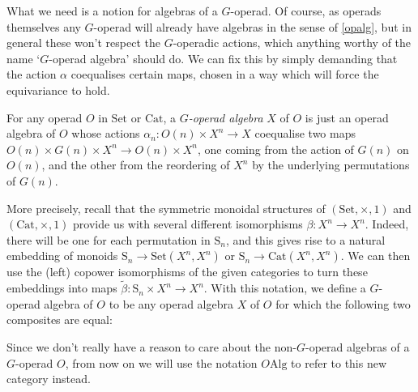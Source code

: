What we need is a notion for algebras of a $G$-operad. Of course, as operads themselves any $G$-operad will already have algebras in the sense of \cref{opalg}, but in general these won't respect the $G$-operadic actions, which anything worthy of the name `$G$-operad algebra' should do. We can fix this by simply demanding that the action $\alpha$ coequalises certain maps, chosen in a way which will force the equivariance to hold.

\begin{defn} \label{Gopalgdef} For any operad $O$ in $\mathrm{Set}$ or $\mathrm{Cat}$, a \emph{$G$-operad algebra} $X$ of $O$ is just an operad algebra of $O$ whose actions $\alpha_n : O(n) \times X^n \to X$ coequalise two maps $O(n) \times G(n) \times X^n \to O(n) \times X^n$, one coming from the action of $G(n)$ on $O(n)$, and the other from the reordering of $X^n$ by the underlying permutations of $G(n)$.

More precisely, recall that the symmetric monoidal structures of $(\mathrm{Set}, \times, 1)$ and $(\mathrm{Cat}, \times, 1)$ provide us with several different isomorphisms $\beta : X^n \to X^n$. Indeed, there will be one for each permutation in $\mathrm{S}_n$, and this gives rise to a natural embedding of monoids $\mathrm{S}_n \to \mathrm{Set}(X^n, X^n)$ or $\mathrm{S}_n \to \mathrm{Cat}(X^n, X^n)$. We can then use the (left) copower isomorphisms of the given categories to turn these embeddings into maps $\tilde{\beta} : \mathrm{S}_n \times X^n \to X^n$. With this notation, we define a $G$-operad algebra of $O$ to be any operad algebra $X$ of $O$ for which the following two composites are equal:
\begin{eq*}  \end{eq*}
Since we don't really have a reason to care about the non-$G$-operad algebras of a $G$-operad $O$, from now on we will use the notation $O\mathrm{Alg}$ to refer to this new category instead.
\end{defn}

